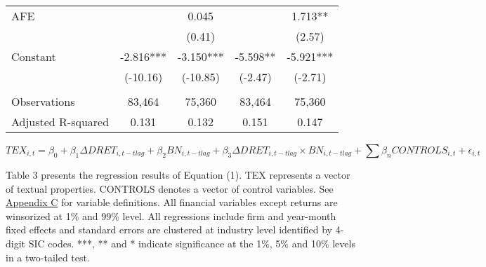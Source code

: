 \begin{table}[H]
\begin{center}
\begin{tabular}{lcccc}
			AFE &   & 0.045 &   & 1.713**  \\
			&   & (0.41) &   & (2.57) \\
			Constant & -2.816*** & -3.150*** & -5.598** & -5.921*** \\
			& (-10.16) & (-10.85) & (-2.47) & (-2.71) \\
			&   &   &   &  \\
			Observations & 83,464 & 75,360 & 83,464 & 75,360 \\
			Adjusted R-squared & 0.131 & 0.132 & 0.151 & 0.147 \\
			\bottomrule
			\bottomrule
		\end{tabular}%
	\end{center}
		\begin{footnotesize}
			\setcounter{equation}{0}
			\begin{equation}
				TEX_{i,t}=\beta_0+\beta_1\Delta DRET_{i,t-tlag}+\beta_2BN_{i,t-tlag}+\beta_3\Delta DRET_{i,t-tlag}\times 			BN_{i,t-tlag}+\sum\beta_nCONTROLS_{i,t}+\epsilon_{i,t}
			\end{equation}
			
			\noindent Table 3 presents the regression results of Equation (1). TEX represents a vector of textual properties. CONTROLS denotes a vector of control variables. See \hyperref[appc]{Appendix C} for variable definitions. All financial variables except returns are winsorized at 1\% and 99\% level. All regressions include firm and year-month fixed effects and standard errors are clustered at industry level identified by 4-digit SIC codes. ***, ** and * indicate significance at the 1\%, 5\% and 10\% levels in a two-tailed test.
		\end{footnotesize}
\end{table}%